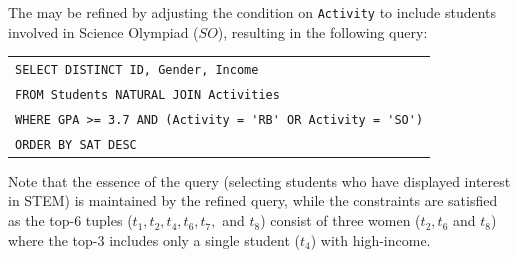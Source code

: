  \begin{example}
    \label{ex:first_refinement}
    The \running{} may be refined by adjusting the condition on \verb"Activity" to include students involved in Science Olympiad ($SO$), resulting in the following query:
    \begin{center}
    \footnotesize
    \begin{tabular}{l}
        \verb"SELECT DISTINCT ID, Gender, Income "\\
        \verb"FROM Students NATURAL JOIN Activities"\\
        \verb"WHERE GPA >= 3.7 AND (Activity = 'RB' OR Activity = 'SO')"\\
        \verb"ORDER BY SAT DESC"\\
    \end{tabular}
    \end{center}
    Note that the essence of the query (selecting students who have displayed interest in STEM) is maintained by the refined query, while the constraints are satisfied as the top-$6$ tuples ($t_1, t_2, t_4, t_6, t_7,$ and $t_8$) consist of three women ($t_2, t_6$ and $t_8$) where the top-$3$ includes only a single student ($t_4$) with high-income.
    
    
\end{example}


 

